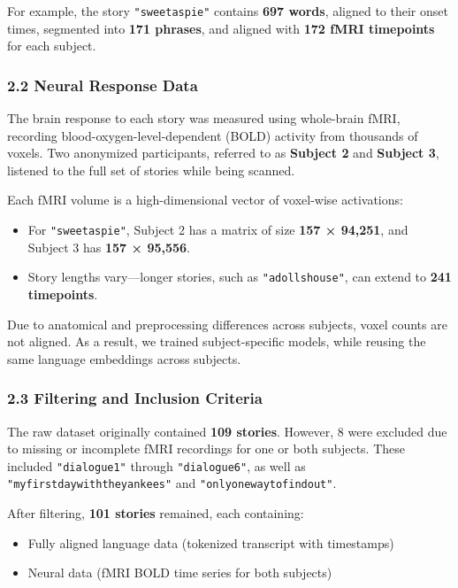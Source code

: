 \documentclass[11pt]{article}
\begin{document}
For example, the story \texttt{"sweetaspie"} contains \textbf{697
words}, aligned to their onset times, segmented into \textbf{171
phrases}, and aligned with \textbf{172 fMRI timepoints} for each
subject.

\hypertarget{neural-response-data}{%
\subsubsection{2.2 Neural Response Data}\label{neural-response-data}}

The brain response to each story was measured using whole-brain fMRI,
recording blood-oxygen-level-dependent (BOLD) activity from thousands of
voxels. Two anonymized participants, referred to as \textbf{Subject 2}
and \textbf{Subject 3}, listened to the full set of stories while being
scanned.

Each fMRI volume is a high-dimensional vector of voxel-wise activations:

\begin{itemize}
\item
  For \texttt{"sweetaspie"}, Subject 2 has a matrix of size \textbf{157
  × 94,251}, and Subject 3 has \textbf{157 × 95,556}.
\item
  Story lengths vary---longer stories, such as \texttt{"adollshouse"},
  can extend to \textbf{241 timepoints}.
\end{itemize}

Due to anatomical and preprocessing differences across subjects, voxel
counts are not aligned. As a result, we trained subject-specific models,
while reusing the same language embeddings across subjects.

\hypertarget{filtering-and-inclusion-criteria}{%
\subsubsection{2.3 Filtering and Inclusion
Criteria}\label{filtering-and-inclusion-criteria}}

The raw dataset originally contained \textbf{109 stories}. However, 8
were excluded due to missing or incomplete fMRI recordings for one or
both subjects. These included \texttt{"dialogue1"} through
\texttt{"dialogue6"}, as well as \texttt{"myfirstdaywiththeyankees"} and
\texttt{"onlyonewaytofindout"}.

After filtering, \textbf{101 stories} remained, each containing:

\begin{itemize}
\item
  Fully aligned language data (tokenized transcript with timestamps)
\item
  Neural data (fMRI BOLD time series for both subjects)
\end{itemize}
\end{document}
